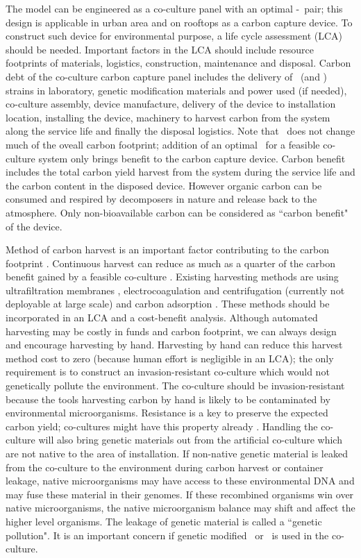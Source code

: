 \documentclass[../thesis.tex]{subfiles} %
\begin{document}
The model can be engineered as a co-culture panel with an optimal \phy-\bac\ pair; this design is applicable in urban area and on rooftops as a carbon capture device.  To construct such device for environmental purpose, a life cycle assessment (LCA) should be needed.  Important factors in the LCA should include resource footprints of materials, logistics, construction, maintenance and disposal.  Carbon debt of the co-culture carbon capture panel includes the delivery of \phy\ (and \bac) strains in laboratory, genetic modification materials and power used (if needed), co-culture assembly, device manufacture, delivery of the device to installation location, installing the device, machinery to harvest carbon from the system along the service life and finally the disposal logistics.  Note that \bac\ does not change much of the oveall carbon footprint; addition of an optimal \bac\ for a feasible co-culture system only brings benefit to the carbon capture device.  Carbon benefit includes the total carbon yield harvest from the system during the service life and the carbon content in the disposed device.  However organic carbon can be consumed and respired by decomposers in nature and release back to the atmosphere.  Only non-bioavailable carbon can be considered as ``carbon benefit" of the device.

Method of carbon harvest is an important factor contributing to the carbon footprint \autocite{fuentes2016impact}.  Continuous harvest can reduce as much as a quarter of the carbon benefit gained by a feasible co-culture \autocite{mata2010microalgae}.  Existing harvesting methods are using ultrafiltration membranes \autocite{zhang2010harvesting}, electrocoagulation and centrifugation (currently not deployable at large scale) \autocite{wijffels2010outlook} and carbon adsorption \autocite{mata2010microalgae,wang2012novel,lee2014repeated}.  These methods should be incorporated in an LCA and a cost-benefit analysis.  Although automated harvesting may be costly in funds and carbon footprint, we can always design and encourage harvesting by hand.  Harvesting by hand can reduce this harvest method cost to zero (because human effort is negligible in an LCA); the only requirement is to construct an invasion-resistant co-culture which would not genetically pollute the environment.  The co-culture should be invasion-resistant because the tools harvesting carbon by hand is likely to be contaminated by environmental microorganisms.  Resistance is a key to preserve the expected carbon yield; co-cultures might have this property already \autocite{fuentes2016impact,seyedsayamdost2011roseobacticides}.  Handling the co-culture will also bring genetic materials out from the artificial co-culture which are not native to the area of installation.  If non-native genetic material is leaked from the co-culture to the environment during carbon harvest or container leakage, native microorganisms may have access to these environmental DNA and may fuse these material in their genomes.  If these recombined organisms win over native microorganisms, the native microorganism balance may shift and affect the higher level organisms.  The leakage of genetic material is called a ``genetic pollution".  It is an important concern if genetic modified \phy\ or \bac\ is used in the co-culture.
\end{document}
